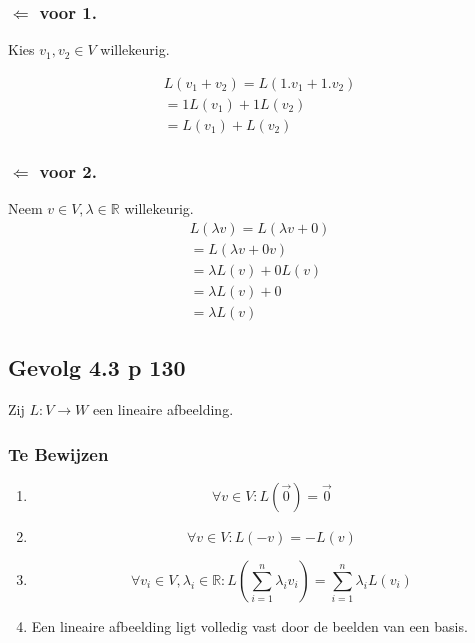 \documentclass[lineaire_algebra_oplossingen.tex]{subfiles}
\begin{document}
\subsubsection*{$\Leftarrow$ voor 1.}
Kies $v_1,v_2 \in V$ willekeurig.

\begin{align*}
L(v_1 + v_2) = L(1.v_1+1.v_2) \tag{co\"effici\"ent 1 in V}\\
=1L(v_1)+1L(v_2) \tag{wegens 3.}\\
=L(v_1)+L(v_2) \tag{co\"effici\"ent 1 in W}
\end{align*}

\subsubsection*{$\Leftarrow$ voor 2.}
Neem $v\in V, \lambda \in \mathbb{R}$ willekeurig.
\begin{align*}
L(\lambda v)=L(\lambda v + 0) \tag{neutraal element in V}\\
=L(\lambda v + 0v)\tag{Lemma 3.8}\\
=\lambda L(v) + 0 L(v) \tag{wegens 3.}\\
=\lambda L(v) + 0 \tag{Lemma 3.8 in W}\\
=\lambda L(v) \tag{neutraal element in W}
\end{align*}


\subsection{Gevolg 4.3 p 130}
\label{4.3}
Zij $L:V\rightarrow W$ een lineaire afbeelding.

\subsubsection*{Te Bewijzen}
\begin{enumerate}
\item
\[\forall v \in V: L(\vec{0})=\vec{0}\]
\item
\[\forall v \in V: L(-v)=-L(v)\]
\item
\[\forall v_i\in V, \lambda_i \in \mathbb{R}: L\left(\sum_{i=1}^n\lambda_iv_i\right) = \sum_{i=1}^n\lambda_iL(v_i)\]
\item
Een lineaire afbeelding ligt volledig vast door de beelden van een basis.
\end{enumerate}
\end{document}
